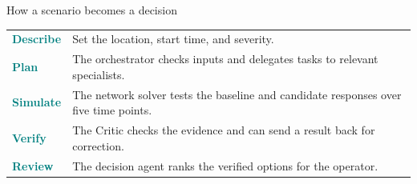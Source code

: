 \documentclass[aspectratio=169,11pt]{beamer}
\begin{document}
\begin{frame}{How a scenario becomes a decision}
\renewcommand{\arraystretch}{1.67}
\begin{tabular}{@{}p{.24\linewidth}p{.69\linewidth}@{}}
\textcolor{teal}{\textbf{Describe}} & Set the location, start time, and severity.\\
\textcolor{teal}{\textbf{Plan}} & The orchestrator checks inputs and delegates tasks to relevant specialists.\\
\textcolor{teal}{\textbf{Simulate}} & The network solver tests the baseline and candidate responses over five time points.\\
\textcolor{teal}{\textbf{Verify}} & The Critic checks the evidence and can send a result back for correction.\\
\textcolor{teal}{\textbf{Review}} & The decision agent ranks the verified options for the operator.\\
\end{tabular}
\end{frame}
\end{document}
